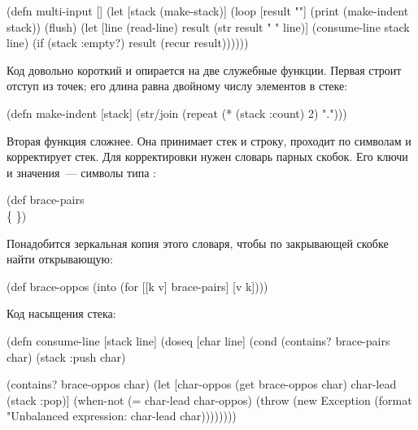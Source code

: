 \begin{english}
  \begin{clojure}
(defn multi-input []
  (let [stack (make-stack)]
    (loop [result ""]
      (print (make-indent stack))
      (flush)
      (let [line (read-line)
            result (str result " " line)]
        (consume-line stack line)
        (if (stack :empty?)
          result
          (recur result))))))
  \end{clojure}
\end{english}

Код довольно короткий и опирается на две служебные функции. Первая  строит отступ из точек; его длина равна двойному числу элементов в стеке:

\begin{english}
  \begin{clojure}
(defn make-indent [stack]
  (str/join (repeat (* (stack :count) 2) ".")))
  \end{clojure}
\end{english}

Вторая функция  сложнее. Она принимает стек и строку, проходит по символам и корректирует стек. Для корректировки нужен словарь парных скобок. Его ключи и значения~--- символы типа :

\begin{english}
  \begin{clojure}
(def brace-pairs
  {\( \)
   \[ \]
   \{ \}})
  \end{clojure}
\end{english}

Понадобится зеркальная копия этого словаря, чтобы по закрывающей скобке найти открывающую:

\begin{english}
  \begin{clojure}
(def brace-oppos
  (into {} (for [[k v] brace-pairs]
             [v k])))
  \end{clojure}
\end{english}

Код насыщения стека:

\begin{english}
  \begin{clojure}
(defn consume-line [stack line]
  (doseq [char line]
    (cond
      (contains? brace-pairs char)
      (stack :push char)

      (contains? brace-oppos char)
      (let [char-oppos
            (get brace-oppos char)
            char-lead
            (stack :pop)]
        (when-not (= char-lead char-oppos)
          (throw
           (new Exception
                (format "Unbalanced expression: %
                        char-lead char))))))))
  \end{clojure}
\end{english}

